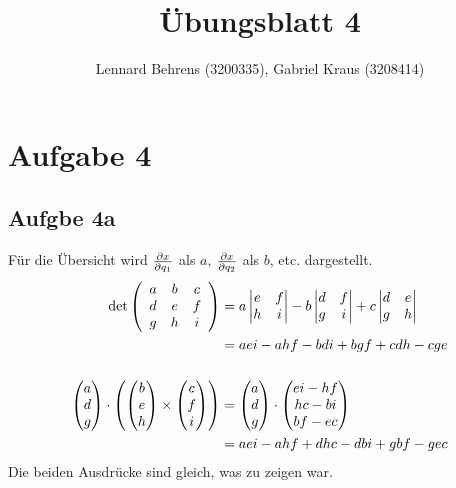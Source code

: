 \documentclass[a4paper,10pt]{extarticle}
\title{Übungsblatt 4}
\author{Lennard Behrens (3200335), Gabriel Kraus (3208414)}
\begin{document}
\maketitle

\section*{Aufgabe 4}
  \subsection*{Aufgbe 4a}
  Für die Übersicht wird $\pdv{x}{q_1}$ als $a$, $\pdv{x}{q_2}$ als $b$, etc. dargestellt.
  \begin{align*}
  \det \left(\begin{array}{c c c}
    a & b & c \\
    d & e & f \\
    g & h & i \\
  \end{array}\right) &= a \begin{vmatrix} e & f \\ h & i \end{vmatrix} - b \begin{vmatrix} d & f \\ g & i \end{vmatrix} + c \begin{vmatrix} d & e \\ g & h\end{vmatrix} \\
  &= aei - ahf - bdi + bgf + cdh - cge \\ \\
  \begin{pmatrix} a \\ d \\ g \end{pmatrix} \cdot \begin{pmatrix} \begin{pmatrix} b \\ e \\ h \end{pmatrix} \times \begin{pmatrix} c \\ f \\ i \end{pmatrix} \end{pmatrix} &= \begin{pmatrix} a \\ d \\ g \end{pmatrix} \cdot \begin{pmatrix} ei - hf \\ hc - bi \\ bf - ec \end{pmatrix} \\
  &= aei - ahf + dhc - dbi + gbf - gec
  \end{align*}
  Die beiden Ausdrücke sind gleich, was zu zeigen war.
\end{document}
